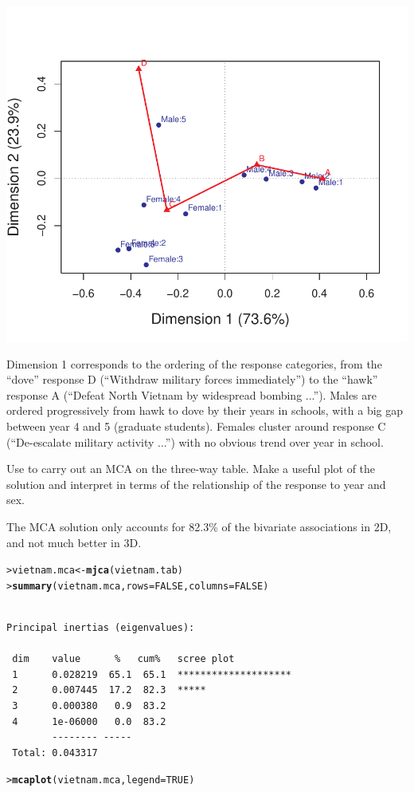 \documentclass[10pt]{report}\usepackage[]{graphicx}\usepackage[]{color}
\makeatletter
\newcommand{\hlnum}[1]{\textcolor[rgb]{0.686,0.059,0.569}{#1}}%
\newcommand{\hlstd}[1]{\textcolor[rgb]{0.345,0.345,0.345}{#1}}%
\newcommand{\hlkwb}[1]{\textcolor[rgb]{0.69,0.353,0.396}{#1}}%
\newcommand{\hlkwc}[1]{\textcolor[rgb]{0.333,0.667,0.333}{#1}}%
\newcommand{\hlkwd}[1]{\textcolor[rgb]{0.737,0.353,0.396}{\textbf{#1}}}%
\newenvironment{kframe}{%
 \def\at@end@of@kframe{}%
 \ifinner\ifhmode%
  \def\at@end@of@kframe{\end{minipage}}%
  \begin{minipage}{\columnwidth}%
 \fi\fi%
 \def\FrameCommand##1{\hskip\@totalleftmargin \hskip-\fboxsep
 \colorbox{shadecolor}{##1}\hskip-\fboxsep
     \hskip-\linewidth \hskip-\@totalleftmargin \hskip\columnwidth}%
 \MakeFramed {\advance\hsize-\width
   \@totalleftmargin\z@ \linewidth\hsize
   \@setminipage}}%
 {\par\unskip\endMakeFramed%
 \at@end@of@kframe}
\newenvironment{knitrout}{}{} %
\renewenvironment{knitrout}{\small\renewcommand{\baselinestretch}{.85}}{} %
\makeatother
\begin{document}
\begin{Exercises}
\begin{enumerate*}
\begin{ans}
\begin{knitrout}
\centerline{\includegraphics[width=.5\textwidth]{soln/fig/ex6_11b-1} }



\end{knitrout}
    Dimension 1 corresponds to the ordering of the response categories, from the ``dove'' response
    D (``Withdraw military forces immediately'') to the ``hawk'' response A 
    (``Defeat North Vietnam by widespread bombing ...'').
    Males are ordered progressively from hawk to dove by their years in schools, with a big gap
    between year 4 and 5 (graduate students).
    Females cluster around response C (``De-escalate military activity ...'') with no obvious
    trend over year in school.
    \end{ans}
    
    \item Use  to carry out an MCA on the three-way table.  Make a useful plot of the solution and interpret
    in terms of the relationship of the response to year and sex.
    \begin{ans}
    The MCA solution only accounts for 82.3\% of the bivariate associations in 2D, and not
    much better in 3D.  
\begin{knitrout}\footnotesize
{}\color{fgcolor}\begin{kframe}
\begin{alltt}
\hlstd{> }\hlstd{vietnam.mca} \hlkwb{<-} \hlkwd{mjca}\hlstd{(vietnam.tab)}
\hlstd{> }\hlkwd{summary}\hlstd{(vietnam.mca,} \hlkwc{rows}\hlstd{=}\hlnum{FALSE}\hlstd{,} \hlkwc{columns}\hlstd{=}\hlnum{FALSE}\hlstd{)}
\end{alltt}
\begin{verbatim}

Principal inertias (eigenvalues):

 dim    value      %   cum%   scree plot               
 1      0.028219  65.1  65.1  ********************     
 2      0.007445  17.2  82.3  *****                    
 3      0.000380   0.9  83.2                           
 4      1e-06000   0.0  83.2                           
        -------- -----                                 
 Total: 0.043317                                       
\end{verbatim}
\begin{alltt}
\hlstd{> }\hlkwd{mcaplot}\hlstd{(vietnam.mca,} \hlkwc{legend}\hlstd{=}\hlnum{TRUE}\hlstd{)}
\end{alltt}
\end{kframe}


\end{knitrout}
\end{ans}
\end{enumerate*}
\end{Exercises}
\end{document}
